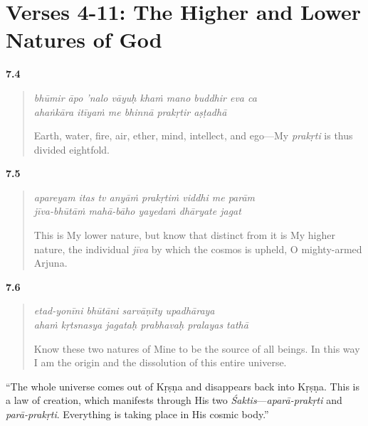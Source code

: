 \section{Verses 4-11: The Higher and Lower Natures of God}\label{sec-verses-4-11-the-higher-and-lower-natures-of-god}

\par\noindent\textbf{7.4}\par
\begin{verse}
\textit{bhūmir āpo ’nalo vāyuḥ khaṁ mano buddhir eva ca} \\
\textit{ahaṅkāra itīyaṁ me bhinnā prakṛtir aṣṭadhā}

\noindent Earth, water, fire, air, ether, mind, intellect, and ego---My \textit{prakṛti} is thus divided eightfold.
\end{verse}
\par



\par\noindent\textbf{7.5}\par
\begin{verse}
\textit{apareyam itas tv anyāṁ prakṛtiṁ viddhi me parām} \\
\textit{jīva-bhūtāṁ mahā-bāho yayedaṁ dhāryate jagat}

\noindent This is My lower nature, but know that distinct from it is My higher nature, the individual \textit{jīva} by which the cosmos is upheld, O mighty-armed Arjuna.
\end{verse}
\par



\par\noindent\textbf{7.6}\par
\begin{verse}
\textit{etad-yonīni bhūtāni sarvāṇīty upadhāraya} \\
\textit{ahaṁ kṛtsnasya jagataḥ prabhavaḥ pralayas tathā}

\noindent Know these two natures of Mine to be the source of all beings. In this way I am the origin and the dissolution of this entire universe.
\end{verse}
\par


\enquote{The whole universe comes out of Kṛṣṇa and disappears back into Kṛṣṇa. This is a law of creation, which manifests through His two \textit{Śaktis}---\textit{aparā-prakṛti} and \textit{parā-prakṛti}. Everything is taking place in His cosmic body.}

